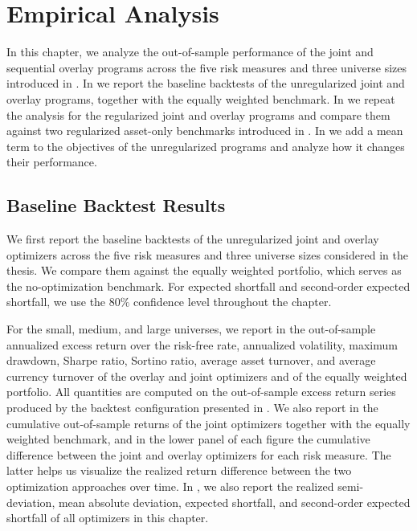 \chapter{Empirical Analysis}\label{chap:backtest-analysis}

In this chapter, we analyze the out-of-sample performance of the joint and sequential overlay programs across the five
risk measures and three universe sizes introduced in .
In  we report the baseline backtests of the unregularized joint and overlay programs,
together with the equally weighted benchmark. In  we repeat the analysis for the
regularized joint and overlay programs and compare them against two regularized asset-only benchmarks introduced in
. In  we add a mean term to the objectives of the unregularized
programs and analyze how it changes their performance.

\section{Baseline Backtest Results} \label{sec:baseline-backtests}

We first report the baseline backtests of the 
unregularized joint and overlay optimizers across the five 
risk measures and three universe sizes considered in the thesis. We compare them against the equally weighted portfolio,
which serves as the no-optimization benchmark. For expected shortfall and second-order expected shortfall, we use the
$80\%$ confidence level throughout the chapter.

For the small, medium, and large universes, we report in  the out-of-sample annualized excess return over the risk-free rate,
annualized volatility, maximum drawdown, Sharpe ratio, Sortino ratio, average asset
turnover, and average currency turnover of the overlay and joint optimizers and of the equally weighted portfolio. All quantities are computed on the out-of-sample excess return 
series produced by the backtest configuration presented in . We also 
report in  the 
cumulative out-of-sample returns of the joint optimizers together with the 
equally weighted benchmark, and in the lower panel of each figure the 
cumulative difference between the joint and overlay optimizers for each risk 
measure. The latter helps us visualize the realized return difference  
between the two optimization approaches over time. In , we also report the
realized semi-deviation, mean absolute deviation, expected shortfall, and second-order expected shortfall of all
optimizers in this chapter.

